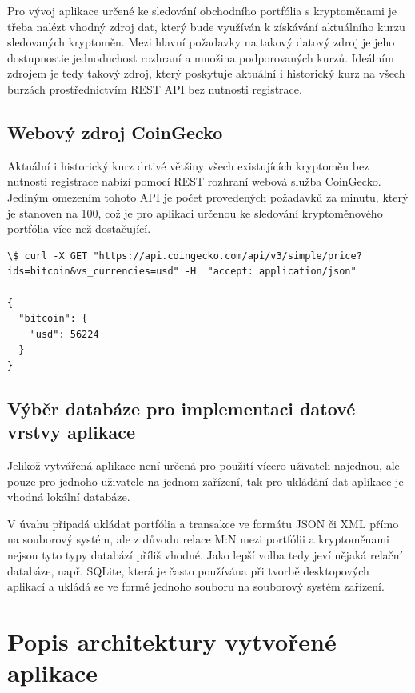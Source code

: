 \documentclass[12pt, a4paper]{article}
\begin{document}
    Pro vývoj aplikace určené ke sledování obchodního portfólia s kryptoměnami je třeba nalézt vhodný zdroj dat, který bude využíván k získávání aktuálního kurzu sledovaných kryptoměn. Mezi hlavní požadavky na takový datový zdroj je jeho dostupnostie jednoduchost rozhraní a množina podporovaných kurzů. Ideálním zdrojem je tedy takový zdroj, který poskytuje aktuální i historický kurz na všech burzách prostřednictvím REST API bez nutnosti registrace.

    \subsection{Webový zdroj CoinGecko}
    Aktuální i historický kurz drtivé většiny všech existujících kryptoměn bez nutnosti registrace nabízí pomocí REST rozhraní webová služba CoinGecko\cite{coingecko2021}. Jediným omezením tohoto API je počet provedených požadavků za minutu, který je stanoven na 100, což je pro aplikaci určenou ke sledování kryptoměnového portfólia více než dostačující.

    \begin{lstlisting}
\$ curl -X GET "https://api.coingecko.com/api/v3/simple/price?ids=bitcoin&vs_currencies=usd" -H  "accept: application/json"

{
  "bitcoin": {
    "usd": 56224
  }
}
    \end{lstlisting}

    \subsection{Výběr databáze pro implementaci datové vrstvy aplikace}

    Jelikož vytvářená aplikace není určená pro použití vícero uživateli najednou, ale pouze pro jednoho uživatele na jednom zařízení, tak pro ukládání dat aplikace je vhodná lokální databáze.

    V úvahu připadá ukládat portfólia a transakce ve formátu JSON či XML přímo na souborový systém, ale z důvodu relace M:N mezi portfólii a kryptoměnami nejsou tyto typy databází příliš vhodné. Jako lepší volba tedy jeví nějaká relační databáze, např. SQLite, která je často používána při tvorbě desktopových aplikací a ukládá se ve formě jednoho souboru na souborový systém zařízení.


    \section{Popis architektury vytvořené aplikace}
\end{document}
